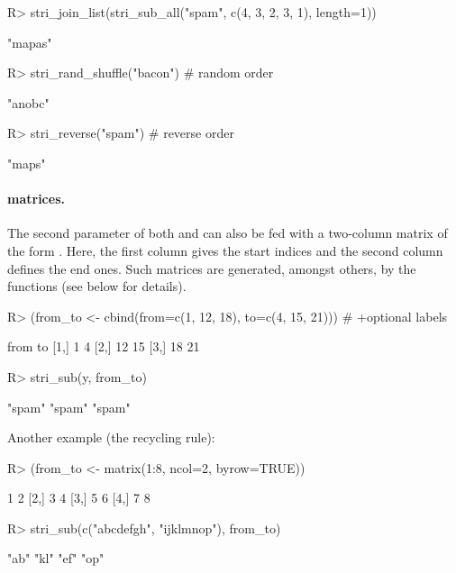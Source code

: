 \documentclass[nojss]{jss}\usepackage[]{graphicx}\usepackage[]{color}
\begin{document}
\begin{Schunk}
\begin{Sinput}
R> stri_join_list(stri_sub_all("spam", c(4, 3, 2, 3, 1), length=1))
\end{Sinput}
\begin{Soutput}
[1] "mapas"
\end{Soutput}
\begin{Sinput}
R> stri_rand_shuffle("bacon")  # random order
\end{Sinput}
\begin{Soutput}
[1] "anobc"
\end{Soutput}
\begin{Sinput}
R> stri_reverse("spam")        # reverse order
\end{Sinput}
\begin{Soutput}
[1] "maps"
\end{Soutput}
\end{Schunk}




\paragraph{ matrices.}
The second parameter of both  and 
can also be fed with a two-column matrix
of the form . Here, the first column
gives the start indices and the second column defines the end ones.
Such matrices are generated, amongst others, by the 
functions (see below for details).

\begin{Schunk}
\begin{Sinput}
R> (from_to <- cbind(from=c(1, 12, 18), to=c(4, 15, 21))) # +optional labels
\end{Sinput}
\begin{Soutput}
     from to
[1,]    1  4
[2,]   12 15
[3,]   18 21
\end{Soutput}
\begin{Sinput}
R> stri_sub(y, from_to)
\end{Sinput}
\begin{Soutput}
[1] "spam" "spam" "spam"
\end{Soutput}
\end{Schunk}


\noindent Another example (the recycling rule):

\begin{Schunk}
\begin{Sinput}
R> (from_to <- matrix(1:8, ncol=2, byrow=TRUE))
\end{Sinput}
\begin{Soutput}
     [,1] [,2]
[1,]    1    2
[2,]    3    4
[3,]    5    6
[4,]    7    8
\end{Soutput}
\begin{Sinput}
R> stri_sub(c("abcdefgh", "ijklmnop"), from_to)
\end{Sinput}
\begin{Soutput}
[1] "ab" "kl" "ef" "op"
\end{Soutput}
\end{Schunk}
\end{document}
